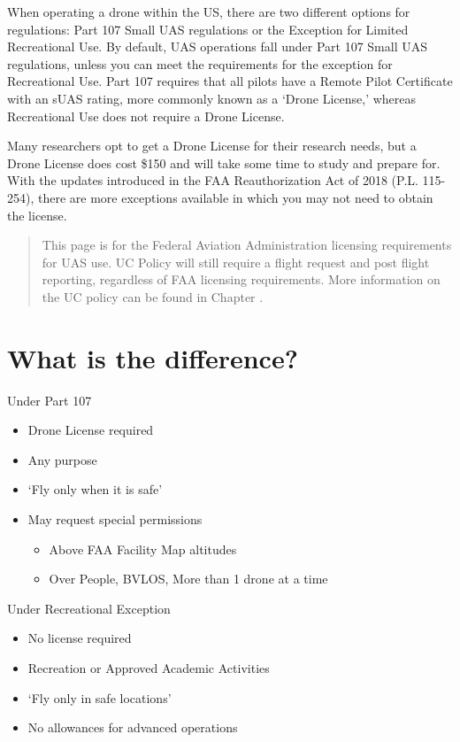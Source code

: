 \documentclass[
]{book}
\providecommand{\tightlist}{%
  \setlength{\itemsep}{0pt}\setlength{\parskip}{0pt}}
\begin{document}
When operating a drone within the US, there are two different options for regulations: Part 107 Small UAS regulations or the Exception for Limited Recreational Use. By default, UAS operations fall under Part 107 Small UAS regulations, unless you can meet the requirements for the exception for Recreational Use. Part 107 requires that all pilots have a Remote Pilot Certificate with an sUAS rating, more commonly known as a `Drone License,' whereas Recreational Use does not require a Drone License.

Many researchers opt to get a Drone License for their research needs, but a Drone License does cost \$150 and will take some time to study and prepare for. With the updates introduced in the FAA Reauthorization Act of 2018 (P.L. 115-254), there are more exceptions available in which you may not need to obtain the license.

\begin{quote}
This page is for the Federal Aviation Administration licensing requirements for UAS use. UC Policy will still require a flight request and post flight reporting, regardless of FAA licensing requirements. More information on the UC policy can be found in Chapter .
\end{quote}

\hypertarget{what-is-the-difference}{%
\section{What is the difference?}\label{what-is-the-difference}}

Under Part 107

\begin{itemize}
\tightlist
\item
  Drone License required
\item
  Any purpose
\item
  `Fly only when it is safe'
\item
  May request special permissions

  \begin{itemize}
  \tightlist
  \item
    Above FAA Facility Map altitudes
  \item
    Over People, BVLOS, More than 1 drone at a time
  \end{itemize}
\end{itemize}

Under Recreational Exception

\begin{itemize}
\tightlist
\item
  No license required
\item
  Recreation or Approved Academic Activities
\item
  `Fly only in safe locations'
\item
  No allowances for advanced operations
\end{itemize}
\end{document}

